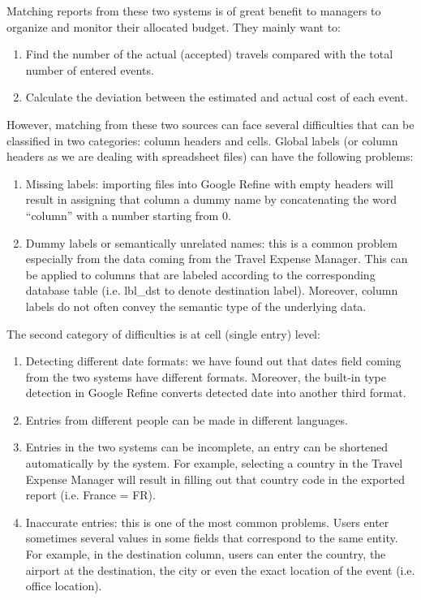 \documentclass{sig-alternate}
\begin{document}
Matching reports from these two systems is of great benefit to managers to organize and monitor their allocated budget. They mainly want to:

\begin{enumerate}
\item  Find the number of the actual (accepted) travels compared with the total number of entered events.

\item  Calculate the deviation between the estimated and actual cost of each event.
\end{enumerate}

However, matching from these two sources can face several difficulties that can be classified in two categories: column headers and cells. Global labels (or column headers as we are dealing with spreadsheet files) can have the following problems:

\begin{enumerate}
\item  Missing labels: importing files into Google Refine with empty headers will result in assigning that column a dummy name by concatenating the word ``column'' with a number starting from 0. 

\item  Dummy labels or semantically unrelated names: this is a common problem especially from the data coming from the Travel Expense Manager. This can be applied to columns that are labeled according to the corresponding database table (i.e. lbl\_dst to denote destination label). Moreover, column labels do not often convey the semantic type of the underlying data.
\end{enumerate}

The second category of difficulties is at cell (single entry) level: 

\begin{enumerate}
\item  Detecting different date formats: we have found out that dates field coming from the two systems have different formats. Moreover, the built-in type detection in Google Refine converts detected date into another third format.

\item  Entries from different people can be made in different languages.

\item  Entries in the two systems can be incomplete, an entry can be shortened automatically by the system. For example, selecting a country in the Travel Expense Manager will result in filling out that country code in the exported report (i.e. France = FR).

\item  Inaccurate entries: this is one of the most common problems. Users enter sometimes several values in some fields that correspond to the same entity. For example, in the destination column, users can enter the country, the airport at the destination, the city or even the exact location of the event (i.e. office location).
\end{enumerate}
\end{document}
